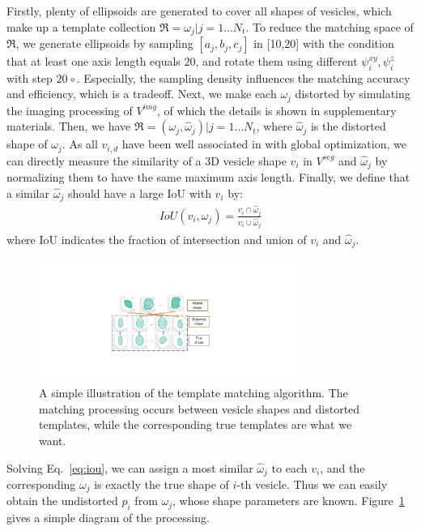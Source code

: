 Firstly, plenty of ellipsoids are generated to cover all shapes of vesicles, which make up a template collection $\Re={\omega_j |j=1\ldots N_t}$.
To reduce the matching space of $\Re$, we generate ellipsoids by sampling $[a_j,b_j,c_j]$ in [10,20] with the condition that at least one axis length equals $20$, and rotate them using different $\psi_i^{xy},\psi_i^z$ with step $20^{}\circ$.
Especially, the sampling density influences the matching accuracy and efficiency, which is a tradeoff.
Next, we make each $\omega_j$ distorted by simulating the imaging processing of $V^{img}$, of which the details is shown in supplementary materials.
Then, we have $\Re={(\omega_j,\hat{\omega}_j )|j=1\ldots N_t}$, where $\hat{\omega}_j$ is the distorted shape of $\omega_j$.
As all $v_{i,d}$ have been well associated in with global optimization, we can directly measure the similarity of a 3D vesicle shape $v_{i}$ in $V^{seg}$ and $\hat{\omega}_j$ by normalizing them to have the same maximum axis length.
Finally, we define that a similar $\hat{\omega}_j$ should have a large IoU with $v_{i}$ by:
\begin{eqnarray}\label{eq:iou}
IoU(v_i,\hat{\omega}_j) = \frac{v_i\cap\hat{\omega}_j}{v_i\cup\hat{\omega}_j}
\end{eqnarray}
where IoU indicates the fraction of intersection and union of $v_{i}$ and $\hat{\omega}_j$.

\begin{figure}
    \begin{center}
        \includegraphics[width=3.3in]{figs/fig_tm.pdf}
    \end{center}
    \caption{A simple illustration of the template matching algorithm. The matching processing occurs between vesicle shapes and distorted templates, while the corresponding true templates are what we want. }
    \label{fig:tm}
\end{figure}

Solving Eq.~\ref{eq:iou}, we can assign a most similar $\hat{\omega}_j$ to each $v_i$, and the corresponding  $\omega_j$ is exactly the true shape of $i$-th vesicle.
Thus we can easily obtain the undistorted $p_i$ from $\omega_j$, whose shape parameters are known.
Figure~\ref{fig:tm} gives a simple diagram of the processing.

